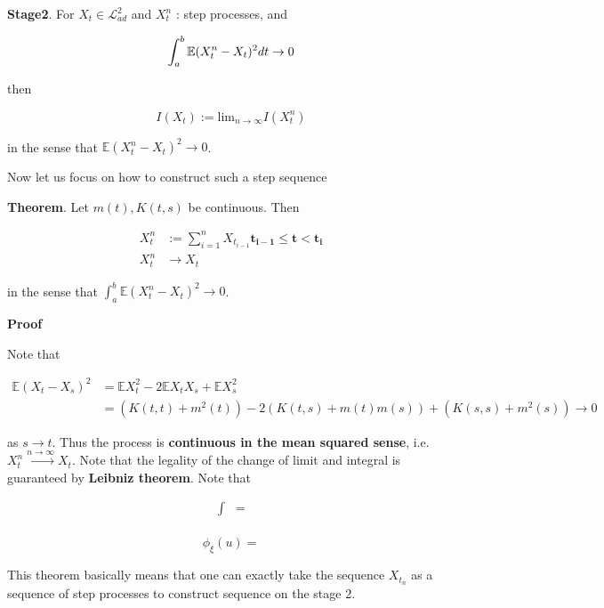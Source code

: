 \documentclass[12pt]{article}
\theoremstyle{nonumberbreak}
\begin{document}
\textbf{Stage2}. For $X_t \in \mathcal{L}^2_{ad}$ and $X_t^n$ : step processes, and 

$$
\int_a^b \mathbb{E} (X_t^n - X_t)^2 dt \to 0 \\[8pt]
$$

then

$$
I(X_t) := \mathrm{lim}_{n\to\infty} I(X_t^n) 
$$

in the sense that $\mathbb{E} (X_t^n - X_t)^2 \to 0$.

Now let us focus on how to construct such a step sequence 

\begin{theorem}
\textbf{Theorem}. Let $m(t), K(t,s)$ be continuous. Then 

$$
\begin{aligned}
X_t^n &:= \sum_{i=1}^n X_{t_{i-1}} \mathbf{t_{i-1} \le t < t_i} \\[8pt]
X_t^n &\to X_t
\end{aligned}
$$

in the sense that $\int_a^b \mathbb{E} (X_t^n - X_t)^2 \to 0$.
\end{theorem}

\textbf{Proof}

Note that 

$$
\begin{aligned}
\mathbb{E} (X_t - X_s)^2 &= \mathbb{E}X_t^2 - 2\mathbb{E}X_t X_s + \mathbb{E} X_s^2 \\[8pt]
&= \left(K(t,t) + m^2(t) \right) - 2 \left( K(t,s) + m(t)m(s) \right) + \left( K(s,s) + m^2(s) \right) \to 0
\end{aligned}
$$

as $s \to t$. Thus the process is \textbf{continuous in the mean squared sense}, i.e. $X_t^n \overset{ n\to\infty} {\to} X_t$. Note that the legality of the change of limit and integral is guaranteed by \textbf{Leibniz theorem}. Note that 

$$
\begin{aligned}
\int  &= \\[8pt]
\end{aligned}
$$

$$
\phi_\xi(u) = 
$$

This theorem basically means that one can exactly take the sequence $X_{t_n}$ as a sequence of step processes to construct sequence on the stage 2. 



\pagebreak
\end{document}
